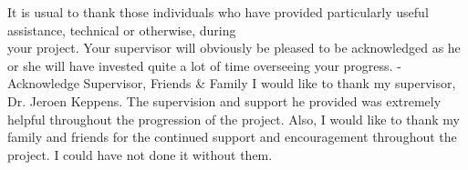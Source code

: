 It is usual to thank those individuals who have provided particularly useful assistance, technical or otherwise, during\\ your project. Your supervisor will obviously be pleased to be acknowledged as he or she will have invested quite a lot of time overseeing your progress.
-Acknowledge Supervisor, Friends \& Family
I would like to thank my supervisor, Dr. Jeroen Keppens. The supervision and support he provided was extremely helpful throughout the progression of the project. Also, I would like to thank my family and friends for the continued support and encouragement throughout the project. I could have not done it without them.